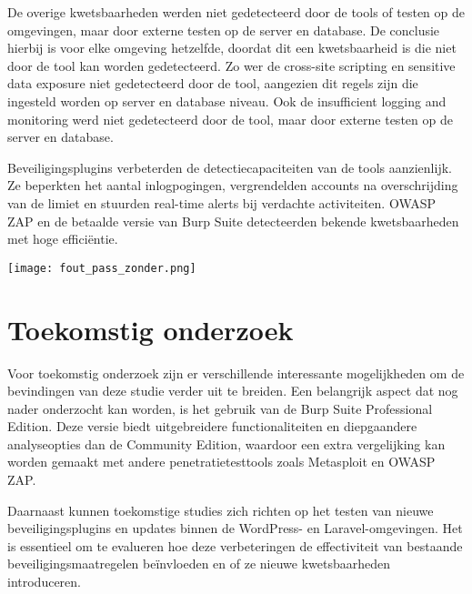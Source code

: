 \documentclass[a0,portrait]{hogent-poster}
\begin{document}
\begin{multicols}{2}
De overige kwetsbaarheden werden niet gedetecteerd door de tools of testen op de omgevingen, maar door externe testen op de 
server en database. De conclusie hierbij is voor elke omgeving hetzelfde, doordat dit een kwetsbaarheid is die niet door de tool 
kan worden gedetecteerd. Zo wer de cross-site scripting en sensitive data exposure niet gedetecteerd door de tool, aangezien dit regels zijn 
die ingesteld worden op server en database niveau. Ook de insufficient logging and monitoring werd niet gedetecteerd door de tool, 
maar door externe testen op de server en database.

Beveiligingsplugins verbeterden de detectiecapaciteiten van de tools aanzienlijk. Ze beperkten het aantal inlogpogingen, 
vergrendelden accounts na overschrijding van de limiet en stuurden real-time alerts bij verdachte activiteiten. OWASP ZAP 
en de betaalde versie van Burp Suite detecteerden bekende kwetsbaarheden met hoge efficiëntie.
\begin{center}
  \captionsetup{type=figure}
  \texttt{[image: fout\_pass\_zonder.png]}
\end{center}
\section{Toekomstig onderzoek}

Voor toekomstig onderzoek zijn er verschillende interessante mogelijkheden om de bevindingen van deze studie verder uit te 
breiden. Een belangrijk aspect dat nog nader onderzocht kan worden, is het gebruik van de Burp Suite Professional Edition. 
Deze versie biedt uitgebreidere functionaliteiten en diepgaandere analyseopties dan de Community Edition, waardoor een extra 
vergelijking kan worden gemaakt met andere penetratietesttools zoals Metasploit en OWASP ZAP.

Daarnaast kunnen toekomstige studies zich richten op het testen van nieuwe beveiligingsplugins en updates binnen de 
WordPress- en Laravel-omgevingen. Het is essentieel om te evalueren hoe deze verbeteringen de effectiviteit van bestaande 
beveiligingsmaatregelen beïnvloeden en of ze nieuwe kwetsbaarheden introduceren.
\end{multicols}
\end{document}
